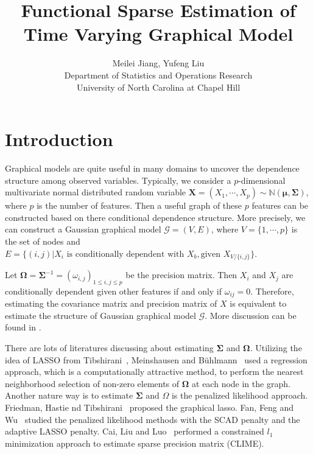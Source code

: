 \documentclass[11pt]{article}
\newcommand{\N}{\mathbb N}
\newcommand{\bX}{\mathbf X}
\newcommand{\bmu}{{\boldsymbol{\mu}}}
\newcommand{\bOmega}{{\boldsymbol{\Omega}}}
\newcommand{\bSigma}{{\boldsymbol{\Sigma}}}
\begin{document}
\author{Meilei Jiang, Yufeng Liu\\
    Department of Statistics and Operations Research\\
		University of North Carolina at Chapel Hill}
\title{Functional Sparse Estimation of Time Varying Graphical Model}

\maketitle

\section{Introduction}

Graphical models are quite useful in many domains to uncover the dependence structure among observed variables. Typically, we consider a $p$-dimensional multivariate normal distributed random variable $ \bX = (X_1, \cdots, X_p) \sim \N(\bmu, \bSigma) $, where $p$ is the number of features. Then a useful graph of these $p$ features can be constructed based on there conditional dependence structure. More precisely, we can construct a Gaussian graphical model $\mathcal{G} = (V, E)$, where $V = \{ 1, \cdots, p\}$ is the set of nodes and $E = \{ (i, j) | X_i \text{ is conditionally dependent with } X_b, \text{given } X_{V/\{i, j\}}\}$.     

Let $\bOmega = \bSigma^{-1} = (\omega_{i,j})_{1\leq i, j \leq p}$ be the precision matrix. Then $X_i$ and $X_j$ are conditionally dependent given other features if and only if $\omega_{ij} = 0$. Therefore, estimating the covariance matrix and precision matrix of $X$ is equivalent to estimate the structure of Gaussian graphical model $\mathcal{G}$. More discussion can be found in \cite{lauritzen1996graphical}.

There are lots of literatures discussing about estimating $\bSigma$ and $\bOmega$. Utilizing the idea of LASSO from Tibshirani~\cite{tibshirani1996regression}, Meinshausen and B{\"u}hlmann~\cite{meinshausen2006high} used a regression approach, which is a computationally attractive method, to perform the nearest neighborhood selection of non-zero elements of $\bOmega$ at each node in the graph. Another nature way is to estimate $\bSigma$ and $\Omega$ is the penalized likelihood approach. Friedman, Hastie nd Tibshirani~\cite{friedman2008sparse} proposed the graphical lasso. Fan, Feng and Wu~\cite{fan2009network} studied the penalized likelihood methods with the SCAD penalty and the adaptive LASSO penalty. Cai, Liu and Luo~\cite{cai2011constrained} performed a constrained $l_1$ minimization approach to estimate sparse precision matrix (CLIME). 
\end{document}
